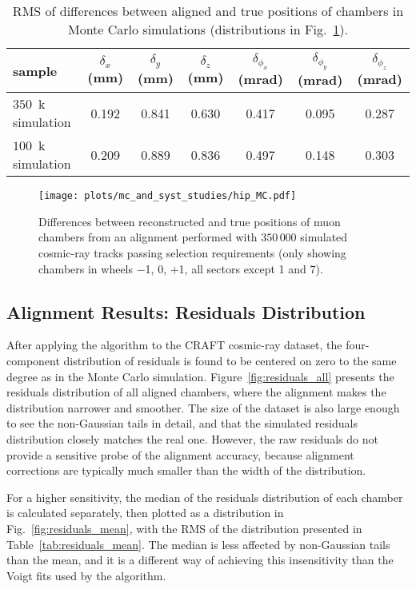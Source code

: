 \documentclass[11pt,twoside,a4paper,cmspaper]{cms-tdr}
\begin{document}
\begin{table}[p]
\caption{RMS of differences between aligned and true positions of
chambers in Monte Carlo simulations (distributions in Fig.~\ref{fig:hip_MC}).  \label{tab:hip_MC}}
\renewcommand{\arraystretch}{1.5}
\begin{center}
\begin{tabular}{l | c c c c c c}
\hline\hline sample & $\delta_x$ (mm) & $\delta_y$ (mm) & $\delta_z$ (mm) & $\delta_{\phi_x}$ (mrad) & $\delta_{\phi_y}$ (mrad) & $\delta_{\phi_z}$ (mrad) \\\hline
$350$~k simulation & 0.192 & 0.841 & 0.630 & 0.417 & 0.095 & 0.287 \\
$100$~k simulation & 0.209 & 0.889 & 0.836 & 0.497 & 0.148 & 0.303 \\\hline\hline
\end{tabular}
\end{center}
\end{table}

\begin{figure}[p]
\texttt{[image: plots/mc\_and\_syst\_studies/hip\_MC.pdf]}

\caption{Differences between reconstructed and true positions of muon
chambers from an alignment performed with $350\,000$ simulated cosmic-ray tracks passing selection requirements
(only showing chambers in wheels $-$1, 0, $+$1, all sectors except 1 and 7). \label{fig:hip_MC}}
\end{figure}

\subsection{Alignment Results: Residuals Distribution}
\label{sec:gmaresults2}

After applying the algorithm to the CRAFT cosmic-ray dataset,
the four-component distribution of residuals is found to be centered on zero
to the same degree as in the Monte Carlo simulation.
Figure~\ref{fig:residuals_all} presents the residuals distribution of
all aligned chambers, where the alignment makes the
distribution narrower and smoother.  The size of the dataset is also
large enough to see the non-Gaussian tails in detail, and that the
simulated residuals distribution closely matches the real one.
However, the raw residuals do not provide a sensitive probe of the
alignment accuracy, because alignment corrections are typically much
smaller than the width of the distribution.

For a higher sensitivity, the median of the residuals
distribution of each chamber is calculated separately, then plotted as a distribution
in Fig.~\ref{fig:residuals_mean}, with the RMS of the distribution presented
in Table~\ref{tab:residuals_mean}.  The median is less affected by
non-Gaussian tails than the mean, and it is a different way of
achieving this insensitivity than the Voigt fits used by the
algorithm.
\end{document}
